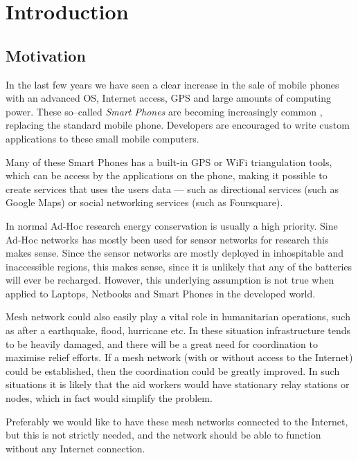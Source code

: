 \section{Introduction}
\label{section:introduction} 

\subsection{Motivation}
In the last few years we have seen a clear increase in the sale of mobile phones with an advanced OS, Internet access, GPS and large amounts of computing power. These so--called \emph{Smart Phones} are becoming increasingly common , replacing the standard mobile phone. Developers are encouraged to write custom applications to these small mobile computers.
 
Many of these Smart Phones has a built-in GPS or WiFi triangulation tools, which can be access by the applications on the phone, making it possible to create services that uses the users data --- such as directional services (such as Google Maps) or social networking services (such as Foursquare).

In normal Ad-Hoc research energy conservation is usually a high priority. Sine Ad-Hoc networks has mostly been used for sensor networks for research this makes sense. Since the sensor networks are mostly deployed in inhospitable and inaccessible regions, this makes sense, since it is unlikely that any of the batteries will ever be recharged. However, this underlying assumption is not true when applied to Laptops, Netbooks and Smart Phones in the developed world. 

Mesh network could also easily play a vital role in humanitarian operations, such as after a earthquake, flood, hurricane etc. In these situation infrastructure tends to be heavily damaged, and there will be a great need for coordination to maximise relief efforts. If a mesh network (with or without access to the Internet) could be established, then the coordination could be greatly improved. In such situations it is likely that the aid workers would have stationary relay stations or nodes, which in fact would simplify the problem.

Preferably we would like to have these mesh networks connected to the Internet, but this is not strictly needed, and the network should be able to function without any Internet connection.
 

